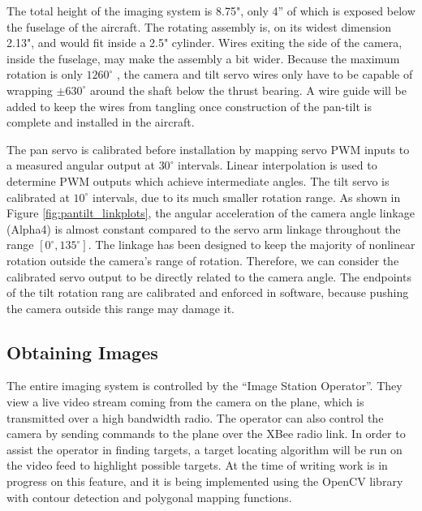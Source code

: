 \documentclass[10pt]{report}
\newcommand{\degrees}[1]
{
\begin{math}
#1^{\circ} 
\end{math}
}
\begin{document}
The total height of the imaging system is 8.75", only 4'' of which is exposed below the fuselage of the aircraft. The rotating assembly is, on its widest dimension 2.13", and would fit inside a 2.5" cylinder. Wires exiting the side of the camera, inside the fuselage, may make the assembly a bit wider. Because the maximum rotation is only \degrees{1260}, the camera and tilt servo wires only have to be capable of wrapping \degrees{\pm 630} around the shaft below the thrust bearing. A wire guide will be added to keep the wires from tangling once construction of the pan-tilt is complete and installed in the aircraft. 

The pan servo is calibrated before installation by mapping servo PWM inputs to a measured angular output at \degrees{30} intervals. Linear interpolation is used to determine PWM outputs which achieve intermediate angles. The tilt servo is calibrated at \degrees{10} intervals, due to its much smaller rotation range. As shown in Figure \ref{fig:pantilt_linkplots}, the angular acceleration of the camera angle linkage (Alpha4) is almost constant compared to the servo arm linkage throughout the range $[0^{\circ}, 135^{\circ}]$. The linkage has been designed to keep the majority of nonlinear rotation outside the camera's range of rotation. Therefore, we can consider the calibrated servo output to be directly related to the camera angle.
The endpoints of the tilt rotation rang are calibrated and enforced in software, because pushing the camera outside this range may damage it.

\subsection{Obtaining Images}

The entire imaging system is controlled by the ``Image Station Operator''.  They view a live video stream coming from the camera on the plane, which is transmitted over a high bandwidth radio.  The operator can also control the camera by sending commands to the plane over the XBee radio link.  In order to assist the operator in finding targets, a target locating algorithm will be run on the video feed to highlight possible targets.  At the time of writing work is in progress on this feature, and it is being implemented using the OpenCV library \cite{opencv} with contour detection and polygonal mapping functions.
\end{document}
